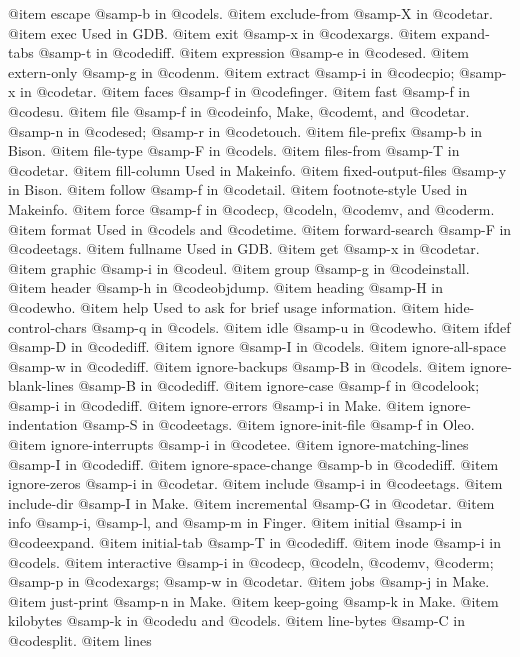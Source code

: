 @item escape
@samp{-b} in @code{ls}.
@item exclude-from
@samp{-X} in @code{tar}.
@item exec
Used in GDB.
@item exit
@samp{-x} in @code{xargs}.
@item expand-tabs
@samp{-t} in @code{diff}.
@item expression
@samp{-e} in @code{sed}.
@item extern-only
@samp{-g} in @code{nm}.
@item extract
@samp{-i} in @code{cpio}; @samp{-x} in @code{tar}.
@item faces
@samp{-f} in @code{finger}.
@item fast
@samp{-f} in @code{su}.
@item file
@samp{-f} in @code{info}, Make, @code{mt}, and @code{tar}.  @samp{-n} in
@code{sed}; @samp{-r} in @code{touch}.
@item file-prefix
@samp{-b} in Bison.
@item file-type
@samp{-F} in @code{ls}.
@item files-from
@samp{-T} in @code{tar}.
@item fill-column
Used in Makeinfo.
@item fixed-output-files
@samp{-y} in Bison.
@item follow
@samp{-f} in @code{tail}.
@item footnote-style
Used in Makeinfo.
@item force
@samp{-f} in @code{cp}, @code{ln}, @code{mv}, and @code{rm}.
@item format
Used in @code{ls} and @code{time}.
@item forward-search
@samp{-F} in @code{etags}.
@item fullname
Used in GDB.
@item get
@samp{-x} in @code{tar}.
@item graphic
@samp{-i} in @code{ul}.
@item group
@samp{-g} in @code{install}.
@item header
@samp{-h} in @code{objdump}.
@item heading
@samp{-H} in @code{who}.
@item help
Used to ask for brief usage information.
@item hide-control-chars
@samp{-q} in @code{ls}.
@item idle
@samp{-u} in @code{who}.
@item ifdef
@samp{-D} in @code{diff}.
@item ignore
@samp{-I} in @code{ls}.
@item ignore-all-space
@samp{-w} in @code{diff}.
@item ignore-backups
@samp{-B} in @code{ls}.
@item ignore-blank-lines
@samp{-B} in @code{diff}.
@item ignore-case
@samp{-f} in @code{look}; @samp{-i} in @code{diff}.
@item ignore-errors
@samp{-i} in Make.
@item ignore-indentation
@samp{-S} in @code{etags}.
@item ignore-init-file
@samp{-f} in Oleo.
@item ignore-interrupts
@samp{-i} in @code{tee}.
@item ignore-matching-lines
@samp{-I} in @code{diff}.
@item ignore-space-change
@samp{-b} in @code{diff}.
@item ignore-zeros
@samp{-i} in @code{tar}.
@item include
@samp{-i} in @code{etags}.
@item include-dir
@samp{-I} in Make.
@item incremental
@samp{-G} in @code{tar}.
@item info
@samp{-i}, @samp{-l}, and @samp{-m} in Finger.
@item initial
@samp{-i} in @code{expand}.
@item initial-tab
@samp{-T} in @code{diff}.
@item inode
@samp{-i} in @code{ls}.
@item interactive
@samp{-i} in @code{cp}, @code{ln}, @code{mv}, @code{rm}; @samp{-p} in
@code{xargs}; @samp{-w} in @code{tar}.
@item jobs
@samp{-j} in Make.
@item just-print
@samp{-n} in Make.
@item keep-going
@samp{-k} in Make.
@item kilobytes
@samp{-k} in @code{du} and @code{ls}.
@item line-bytes
@samp{-C} in @code{split}.
@item lines
